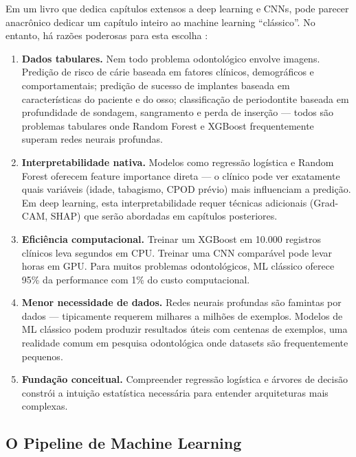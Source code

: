 Em um livro que dedica capítulos extensos a deep learning e CNNs, pode parecer anacrônico dedicar um capítulo inteiro ao machine learning ``clássico''. No entanto, há razões poderosas para esta escolha :

\begin{enumerate}
    \item \textbf{Dados tabulares.} Nem todo problema odontológico envolve imagens. Predição de risco de cárie baseada em fatores clínicos, demográficos e comportamentais; predição de sucesso de implantes baseada em características do paciente e do osso; classificação de periodontite baseada em profundidade de sondagem, sangramento e perda de inserção — todos são problemas tabulares onde Random Forest e XGBoost frequentemente superam redes neurais profundas.
    
    \item \textbf{Interpretabilidade nativa.} Modelos como regressão logística e Random Forest oferecem feature importance direta — o clínico pode ver exatamente quais variáveis (idade, tabagismo, CPOD prévio) mais influenciam a predição. Em deep learning, esta interpretabilidade requer técnicas adicionais (Grad-CAM, SHAP) que serão abordadas em capítulos posteriores.
    
    \item \textbf{Eficiência computacional.} Treinar um XGBoost em 10.000 registros clínicos leva segundos em CPU. Treinar uma CNN comparável pode levar horas em GPU. Para muitos problemas odontológicos, ML clássico oferece 95\% da performance com 1\% do custo computacional.
    
    \item \textbf{Menor necessidade de dados.} Redes neurais profundas são famintas por dados — tipicamente requerem milhares a milhões de exemplos. Modelos de ML clássico podem produzir resultados úteis com centenas de exemplos, uma realidade comum em pesquisa odontológica onde datasets são frequentemente pequenos.
    
    \item \textbf{Fundação conceitual.} Compreender regressão logística e árvores de decisão constrói a intuição estatística necessária para entender arquiteturas mais complexas.
\end{enumerate}

\subsection{O Pipeline de Machine Learning}

